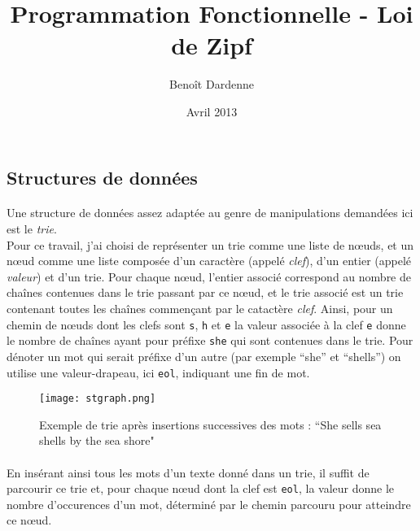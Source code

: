 \documentclass{article}
\title{Programmation Fonctionnelle - Loi de Zipf}
\author{Benoît Dardenne}
\date{Avril 2013}
\begin{document}
\maketitle


\subsection*{Structures de données}

\paragraph{} Une structure de données assez adaptée au genre de manipulations demandées ici est le \emph{trie}.\\
Pour ce travail, j'ai choisi de représenter un trie comme une liste de nœuds, 
et un nœud comme une liste 
composée d'un caractère (appelé \emph{clef}), d'un entier (appelé \emph{valeur}) et d'un trie. 
Pour chaque nœud, l'entier associé correspond
au nombre de chaînes contenues dans le trie passant par ce nœud, et le trie associé est un trie 
contenant toutes les chaînes commençant par le catactère \emph{clef}. 
Ainsi, pour un chemin de nœuds dont les clefs sont \verb#s#, \verb#h# et \verb#e# 
la valeur associée à la clef \verb#e# donne le nombre de chaînes ayant pour préfixe \verb#she#
qui sont contenues dans le trie.
Pour dénoter un mot qui serait préfixe d'un autre (par exemple ``she'' et ``shells'') on utilise une
valeur-drapeau, ici \verb#eol#, indiquant une fin de mot.

\begin{figure}[H]
   \centering
   \texttt{[image: stgraph.png]}
   \label{fig:trie}
   \caption{Exemple de trie après insertions successives des mots : ``She sells sea shells by the sea shore"}
\end{figure}

\paragraph{} En insérant ainsi tous les mots d'un texte donné dans un trie, il suffit de parcourir ce trie et,
pour chaque nœud dont la clef est \verb#eol#, la valeur donne le nombre d'occurences d'un mot, déterminé 
par le chemin parcouru pour atteindre ce nœud. 
\end{document}
